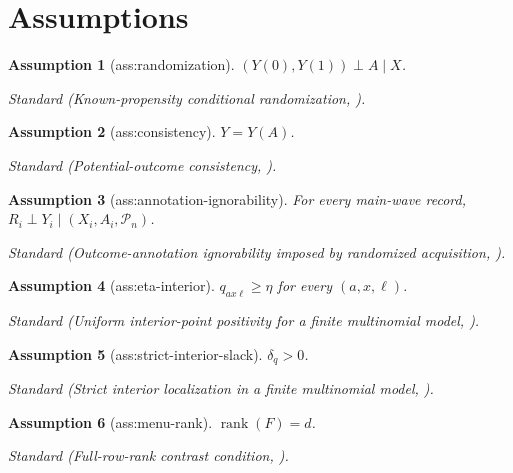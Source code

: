 \documentclass{article}
\newtheorem{assumption}{Assumption}
\begin{document}
\section{Assumptions}

\begin{assumption}[ass:randomization]\label{ass:randomization}
\((Y(0),Y(1))\perp A\mid X\).
\par\smallskip\noindent\emph{Standard} (Known-propensity conditional randomization, \cite{NwankwoGoldkindZhou2026BatchAdaptive}).
\end{assumption}

\begin{assumption}[ass:consistency]\label{ass:consistency}
\(Y=Y(A)\).
\par\smallskip\noindent\emph{Standard} (Potential-outcome consistency, \cite{AtheyWager2021PolicyLearning}).
\end{assumption}

\begin{assumption}[ass:annotation-ignorability]\label{ass:annotation-ignorability}
For every main-wave record, \(R_i\perp Y_i\mid(X_i,A_i,\mathscr P_n)\).
\par\smallskip\noindent\emph{Standard} (Outcome-annotation ignorability imposed by randomized acquisition, \cite{NwankwoGoldkindZhou2026BatchAdaptive}).
\end{assumption}

\begin{assumption}[ass:eta-interior]\label{ass:eta-interior}
\(q_{ax\ell}\ge\eta\) for every \((a,x,\ell)\).
\par\smallskip\noindent\emph{Standard} (Uniform interior-point positivity for a finite multinomial model, \cite{vanDerVaart1998AsymptoticStatistics}).
\end{assumption}

\begin{assumption}[ass:strict-interior-slack]\label{ass:strict-interior-slack}
\(\delta_q>0\).
\par\smallskip\noindent\emph{Standard} (Strict interior localization in a finite multinomial model, \cite{vanDerVaart1998AsymptoticStatistics}).
\end{assumption}

\begin{assumption}[ass:menu-rank]\label{ass:menu-rank}
\(\operatorname{rank}(F)=d\).
\par\smallskip\noindent\emph{Standard} (Full-row-rank contrast condition, \cite{WangWangMiao2026MaximinTwoPhase}).
\end{assumption}
\end{document}
